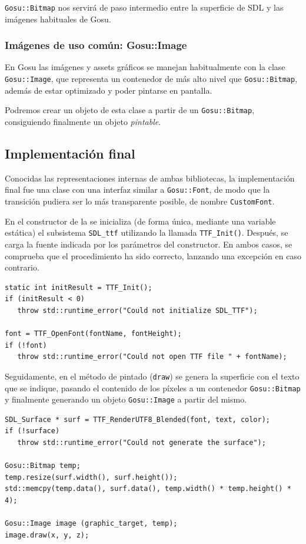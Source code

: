 \texttt{Gosu::Bitmap} nos servirá de paso intermedio entre la superficie de SDL y las
imágenes habituales de Gosu.

\subsubsection{Imágenes de uso común: Gosu::Image}
En Gosu las imágenes y assets gráficos se manejan habitualmente con la clase
\texttt{Gosu::Image}, que representa un contenedor de más alto nivel que
\texttt{Gosu::Bitmap}, además de estar optimizado y poder pintarse en pantalla.

Podremos crear un objeto de esta clase a partir de un \texttt{Gosu::Bitmap}, consiguiendo
finalmente un objeto \textit{pintable}.


\subsection{Implementación final}

Conocidas las representaciones internas de ambas bibliotecas, la implementación
final fue una clase con una interfaz similar a \texttt{Gosu::Font}, de modo que
la transición pudiera ser lo más transparente posible, de nombre
\texttt{CustomFont}.

En el constructor de la se inicializa (de forma única, mediante una variable
estática) el subsistema \texttt{SDL\_ttf} utilizando la llamada
\texttt{TTF\_Init()}. Después, se carga la fuente indicada por los parámetros
del constructor. En ambos casos, se comprueba que el procedimiento ha sido
correcto, lanzando una excepción en caso contrario.

\begin{verbatim}
static int initResult = TTF_Init();
if (initResult < 0)
   throw std::runtime_error("Could not initialize SDL_TTF");

font = TTF_OpenFont(fontName, fontHeight);
if (!font)
   throw std::runtime_error("Could not open TTF file " + fontName);

\end{verbatim}

Seguidamente, en el método de pintado (\texttt{draw}) se genera la superficie
con el texto que se indique, pasando el contenido de los píxeles a un contenedor
\texttt{Gosu::Bitmap} y finalmente generando un objeto \texttt{Gosu::Image} a
partir del mismo.

\begin{verbatim}
SDL_Surface * surf = TTF_RenderUTF8_Blended(font, text, color);
if (!surface)
   throw std::runtime_error("Could not generate the surface");

Gosu::Bitmap temp;
temp.resize(surf.width(), surf.height());
std::memcpy(temp.data(), surf.data(), temp.width() * temp.height() * 4);

Gosu::Image image (graphic_target, temp);
image.draw(x, y, z);
\end{verbatim}


